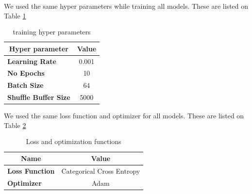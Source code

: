 \documentclass[twocolumn,conference]{article}
\begin{document}
We used the same hyper parameters while training all models. These are listed on Table \ref{tab:training-hyperparams}

\begin{table}[!htb]
\captionsetup{size=footnotesize}
\begin{tabular}{ p{17em} c}
\toprule
\multicolumn{1}{c}{\textbf{Hyper parameter}} & 
	\multicolumn{1}{c}{\textbf{Value}}\\
\midrule
\textbf{Learning Rate}&	0.001\\
\textbf{No Epochs}&	10\\
\textbf{Batch Size}&	64\\
\textbf{Shuffle Buffer Size}&	5000\\
\bottomrule
\end{tabular}
\caption{training hyper parameters} \label{tab:training-hyperparams}
\end{table}

We used the same loss function and optimizer for all models. These are listed on Table \ref{tab:training-loss-optimizer}

\begin{table}[!htb]
\captionsetup{size=footnotesize}
\begin{tabular}{ p{9em} c}
\toprule
\multicolumn{1}{c}{\textbf{Name}} & 
	\multicolumn{1}{c}{\textbf{Value}}\\
\midrule
\textbf{Loss Function}&	Categorical Cross Entropy\\
\textbf{Optimizer}&	Adam\\
\bottomrule
\end{tabular}
\caption{Loss and optimization functions} \label{tab:training-loss-optimizer}
\end{table}
\end{document}

